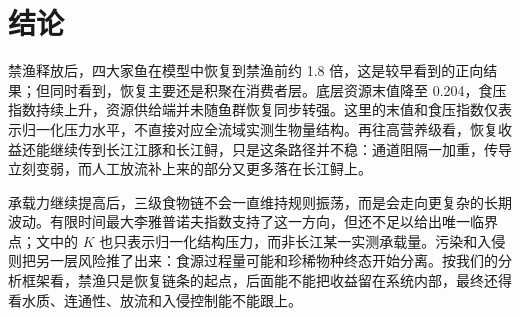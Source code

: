 \section{结论}
禁渔释放后，四大家鱼在模型中恢复到禁渔前约 1.8 倍，这是较早看到的正向结果；但同时看到，恢复主要还是积聚在消费者层。底层资源末值降至 0.204，食压指数持续上升，资源供给端并未随鱼群恢复同步转强。这里的末值和食压指数仅表示归一化压力水平，不直接对应全流域实测生物量结构。再往高营养级看，恢复收益还能继续传到长江江豚和长江鲟，只是这条路径并不稳：通道阻隔一加重，传导立刻变弱，而人工放流补上来的部分又更多落在长江鲟上。

承载力继续提高后，三级食物链不会一直维持规则振荡，而是会走向更复杂的长期波动。有限时间最大李雅普诺夫指数支持了这一方向，但还不足以给出唯一临界点；文中的 $K$ 也只表示归一化结构压力，而非长江某一实测承载量。污染和入侵则把另一层风险推了出来：食源过程量可能和珍稀物种终态开始分离。按我们的分析框架看，禁渔只是恢复链条的起点，后面能不能把收益留在系统内部，最终还得看水质、连通性、放流和入侵控制能不能跟上。

